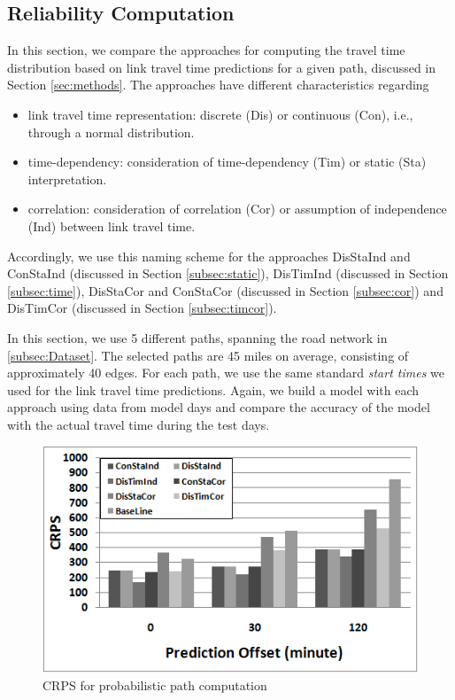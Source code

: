 \subsection{Reliability Computation}
In this section, we compare the approaches for computing the travel
time distribution based on link travel time predictions for a given path,
discussed in Section \ref{sec:methods}. The approaches have different
characteristics regarding
\begin{itemize}
  \item link travel time representation: discrete (Dis) or continuous (Con),
  i.e., through a normal distribution.
  \item time-dependency: consideration of time-dependency (Tim) or static (Sta)
  interpretation.
  \item correlation: consideration of correlation (Cor) or assumption of
  independence (Ind) between link travel time.
\end{itemize}

Accordingly, we use this naming scheme for the approaches DisStaInd and
ConStaInd (discussed in Section \ref{subsec:static}), DisTimInd (discussed
in Section \ref{subsec:time}), DisStaCor and ConStaCor (discussed
in Section \ref{subsec:cor}) and DisTimCor (discussed
in Section \ref{subsec:timcor}).

In this section, we use 5 different paths, spanning the road network in \ref{subsec:Dataset}. The selected
paths are 45 miles on average, consisting of approximately 40 edges. For each
path, we use the same standard \textit{start times} we used for the link travel time predictions. Again, we build a model with each approach using data from model days and compare the accuracy of the model with the actual travel time during the test days.

\begin{figure}[h]
	\centering
	\includegraphics[width = 0.75\columnwidth]{figures/path1_results.png}
	\caption{CRPS for probabilistic path computation}\label{fig:path_comp}
		\vspace{-0.3cm}
\end{figure}

